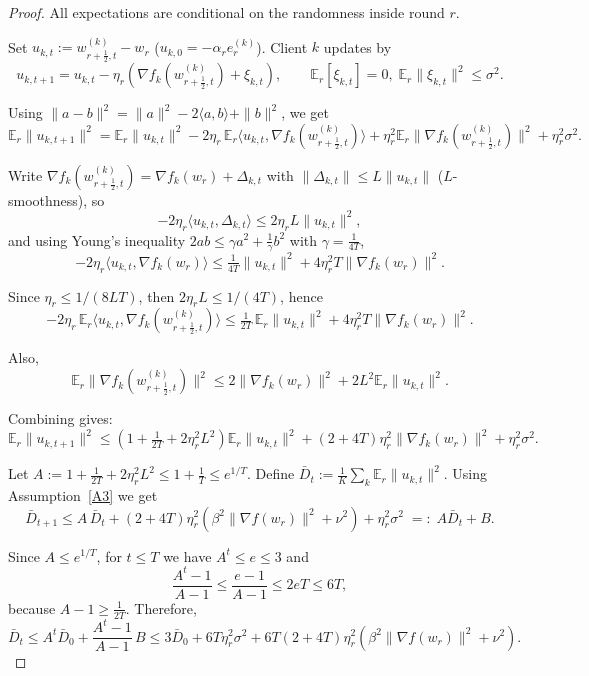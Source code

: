\documentclass[10pt,a4paper]{amsart}
\begin{document}
\begin{proof}
All expectations are conditional on the randomness inside round \(r\).

Set \(u_{k,t} := w_{r+\frac12,t}^{(k)} - w_r\) (\(u_{k,0} = -\alpha_r e_r^{(k)}\)).
Client \(k\) updates by
\[
u_{k,t+1} = u_{k,t} - \eta_r
          \left(\nabla f_k(w_{r+\frac12,t}^{(k)}) + \xi_{k,t}\right),
\qquad
\mathbb{E}_r[\xi_{k,t}] = 0,\;
\mathbb{E}_r\|\xi_{k,t}\|^{2} \le \sigma^{2}.
\]

Using \(\|a - b\|^{2} = \|a\|^{2} - 2\langle a, b\rangle + \|b\|^{2}\), we get
\[
\mathbb{E}_r\|u_{k,t+1}\|^{2}
= \mathbb{E}_r\|u_{k,t}\|^{2}
   - 2\eta_r\,\mathbb{E}_r\langle u_{k,t}, \nabla f_k(w_{r+\frac12,t}^{(k)})\rangle
   + \eta_r^{2}\mathbb{E}_r\|\nabla f_k(w_{r+\frac12,t}^{(k)})\|^{2}
   + \eta_r^{2}\sigma^{2}.
\]

Write \(\nabla f_k(w_{r+\frac12,t}^{(k)}) = \nabla f_k(w_r) + \Delta_{k,t}\)
with \(\|\Delta_{k,t}\| \le L\|u_{k,t}\|\) (\(L\)-smoothness), so
\[
-2\eta_r\langle u_{k,t}, \Delta_{k,t} \rangle
    \le 2\eta_r L\|u_{k,t}\|^{2},
\]
and using Young’s inequality \( 2ab \le \gamma a^2 + \frac{1}{\gamma}b^2 \) with $\gamma = \frac{1}{4T}$,
\[
-2\eta_r\langle u_{k,t}, \nabla f_k(w_r) \rangle
\le \tfrac{1}{4T}\|u_{k,t}\|^{2} + 4\eta_r^{2}T\|\nabla f_k(w_r)\|^{2}.
\]

Since \(\eta_r \le 1/(8LT)\), then \(2\eta_r L \le 1/(4T)\), hence
\[
-2\eta_r\,\mathbb{E}_r\langle u_{k,t}, \nabla f_k(w_{r+\frac12,t}^{(k)})\rangle
\le \tfrac{1}{2T}\,\mathbb{E}_r\|u_{k,t}\|^{2}
        + 4\eta_r^{2}T\|\nabla f_k(w_r)\|^{2}.
\]

Also,
\[
\mathbb{E}_r\|\nabla f_k(w_{r+\frac12,t}^{(k)})\|^{2}
\le 2\|\nabla f_k(w_r)\|^{2} + 2L^{2}\mathbb{E}_r\|u_{k,t}\|^{2}.
\]

Combining gives:
\[
\mathbb{E}_r\|u_{k,t+1}\|^{2}
\le \left(1 + \tfrac{1}{2T} + 2\eta_r^{2}L^{2}\right)\mathbb{E}_r\|u_{k,t}\|^{2}
+ (2 + 4T)\eta_r^{2}\|\nabla f_k(w_r)\|^{2}
+ \eta_r^{2}\sigma^{2}.
\]

Let \(A := 1 + \tfrac{1}{2T} + 2\eta_r^{2}L^{2} \le 1 + \tfrac{1}{T} \le e^{1/T}\).
Define \(\bar D_t := \frac{1}{K} \sum_k \mathbb{E}_r\|u_{k,t}\|^{2}\).
Using Assumption~\ref{A3} we get
\[
\bar D_{t+1}
\le A\,\bar D_t
+ (2 + 4T)\eta_r^{2}
  \left(\beta^{2}\|\nabla f(w_r)\|^{2} + \nu^{2} \right)
+ \eta_r^{2}\sigma^{2} \;=:\; A\bar D_t + B.
\]

Since \(A \le e^{1/T}\), for \(t\le T\) we have \(A^{t} \le e \le 3\) and
\[
\frac{A^{t}-1}{A-1} \le \frac{e-1}{A-1} \le 2eT \le 6T,
\]
because \(A-1 \ge \tfrac{1}{2T}\).
Therefore,
\[
\bar D_t
\le A^{t}\bar D_0 + \frac{A^{t}-1}{A-1}\,B
\le 3\bar D_0
+ 6T \eta_r^{2} \sigma^{2}
+ 6T (2 + 4T) \eta_r^{2}
  \left( \beta^{2} \|\nabla f(w_r)\|^{2} + \nu^{2} \right).
\]


\end{proof}
\end{document}
